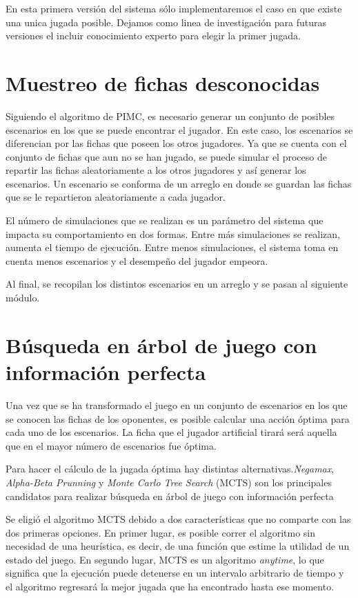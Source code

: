 En esta primera versión del sistema sólo implementaremos el caso en que existe una unica jugada 
posible. Dejamos como linea de investigación para futuras versiones el incluir conocimiento 
experto para elegir la primer jugada.

\section{Muestreo de fichas desconocidas}

Siguiendo el algoritmo de PIMC, es necesario generar un conjunto de posibles escenarios 
en los que se puede encontrar el jugador. En este caso, los escenarios se diferencian por las 
fichas que poseen los otros jugadores. Ya que se cuenta con el conjunto de fichas que aun 
no se han jugado, se puede simular el proceso de repartir las fichas aleatoriamente a los 
otros jugadores y así generar los escenarios. Un escenario se conforma de un arreglo en 
donde se guardan las fichas que se le repartieron aleatoriamente a cada jugador.  

El número de simulaciones que se realizan es un parámetro del sistema que impacta su 
comportamiento en dos formas. Entre más simulaciones se realizan, aumenta el tiempo de 
ejecución. Entre menos simulaciones, el sistema toma en cuenta menos escenarios y el 
desempeño del jugador empeora. 

Al final, se recopilan los distintos escenarios en un arreglo y se pasan al siguiente módulo.

\section{Búsqueda en árbol de juego con información perfecta}

Una vez que se ha transformado el juego en un conjunto de escenarios en los que se 
conocen las fichas de los oponentes, es posible calcular una acción óptima para cada uno de 
los escenarios. La ficha que el jugador artificial tirará será aquella que en el mayor número 
de escenarios fue óptima.

Para hacer el cálculo de la jugada óptima hay distintas alternativas.\textit{Negamax}, \textit{Alpha-Beta Prunning} 
y \textit{Monte Carlo Tree Search} (MCTS) son los principales candidatos para realizar 
búsqueda en árbol de juego con información perfecta

Se eligió el algoritmo MCTS debido a dos características que no comparte con las dos 
primeras opciones. En primer lugar, es posible correr el algoritmo sin necesidad de una 
heurística, es decir, de una función que estime la utilidad de un estado del juego. En 
segundo lugar, MCTS es un algoritmo \textit{anytime}, lo que significa que la ejecución puede 
detenerse en un intervalo arbitrario de tiempo y el algoritmo regresará la mejor jugada que 
ha encontrado hasta ese momento.

